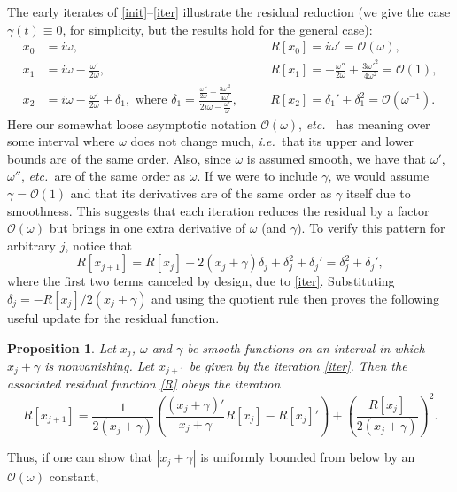 \documentclass[10pt]{article}
\newcommand{\be}{\begin{equation}}
\newcommand{\ee}{\end{equation}}
\newcommand{\ie}{{\it i.e.\ }}
\newcommand{\etc}{{\it etc.\ }}
\newcommand{\bigO}{{\mathcal O}}
\newtheorem{pro}[thm]{Proposition}
\newcommand{\om}{\omega}
\newcommand{\g}{\gamma}
\begin{document}
The early iterates of \cref{init}--\cref{iter} illustrate
the residual reduction (we give the case $\g(t) \equiv 0$, for
simplicity, but the results hold for the general case):
\begin{align}
x_0 &=  i\om, &&R[x_0] = i\om' = \bigO(\om), \nonumber \\
x_1 &= i\om - \frac{\om'}{2\om}, &&R[x_1] = -\frac{\om''}{2\om} +
    \frac{3\om'^2}{4\om^2} = \bigO(1), \label{x1R1} \\
x_2 &= i\om - \frac{\om'}{2\om} + \delta_1, \text{ where }
    \delta_1 = \frac{\frac{\om''}{2\om} - \frac{3\om'^2}{4\om^2}}{2i\om - \frac{\om'}{\om}}, \quad
    &&R[x_2] = \delta_1' + \delta_1^2 = \bigO(\om^{-1}). \nonumber
\end{align}
Here our somewhat loose asymptotic notation $\bigO(\om)$, \etc 
has meaning over some interval where $\om$ does not change much,
\ie that its upper and lower bounds are of the same order.
Also, since $\om$ is assumed smooth, we have that $\om'$, $\om''$, \etc are
of the same order as $\om$.
If we were to include $\g$, we would assume $\g = \bigO(1)$
and that its derivatives are of the same order as $\g$ itself due to smoothness.
This suggests that each iteration reduces the residual by a factor $\bigO(\om)$
but brings in one extra derivative of $\om$ (and $\g$).
To verify this pattern for arbitrary $j$, notice that
$$
R[x_{j+1}] = R[x_j] + 2\left(x_j + \g \right)\delta_j  + \delta_j^2 + \delta_j' = \delta_j^2 + \delta_j',
$$
where the first two terms canceled by design, due to \cref{iter}.
Substituting $\delta_j = -R[x_j]/2(x_j + \g)$ and using
the quotient rule then proves the following useful update
for the residual function.
\begin{pro}\label{PRiter}  
  Let $x_j$, $\om$ and $\gamma$ be smooth functions on an interval
  in which $x_j+\gamma$ is nonvanishing.
  Let $x_{j+1}$ be given by the iteration \cref{iter}.
  Then the associated residual function \cref{R} obeys the iteration
  \be
  \label{Riter}
    R[x_{j+1}] = \frac{1}{2(x_j + \g)}\left( \frac{(x_j + \g)'}{x_j + \g} R[x_j] - R[x_j]' \right) 
    + \left(\frac{R[x_j]}{2(x_j + \g)}\right)^2. 
  \ee
\end{pro}                  
Thus, if one can show that $|x_j+\gamma|$ is uniformly bounded from
below by an $\bigO(\om)$ constant,
\end{document}

